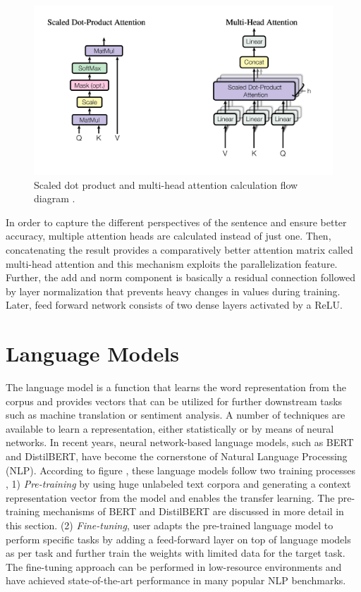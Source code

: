 \documentclass[%
	BCOR=8mm, %
	DIV=12,
	toc=bibliography, %
	toc=listof, %
	oneside, %
	egregdoesnotlikesansseriftitles, %
	]{scrbook}
\begin{document}
\begin{figure}
    \centering
    \includegraphics[width=0.7\linewidth]{screenshot001}
    \caption[Calculation flow diagram of Scaled dot product and multi-head attention]{\small Scaled dot product and multi-head attention calculation flow diagram \cite{vaswani_attention_2017}. }
    \label{fig:selftattentionandmulti}
\end{figure}
In order to capture the different perspectives of the sentence and ensure better accuracy, multiple attention heads are calculated instead of just one. Then, concatenating the result provides a comparatively better attention matrix called multi-head attention and this mechanism exploits the parallelization feature.\\
Further, the add and norm component is basically a residual connection followed by layer normalization that prevents heavy changes in values during training. Later, feed forward network consists of two dense layers activated by a ReLU. 
\section{Language Models}
\label{section:langaugemodels}
The language model is a function that learns the word representation from the corpus and provides vectors that can be utilized for further downstream tasks such as machine translation or sentiment analysis. A number of techniques are available to learn a representation, either statistically or by means of neural networks. In recent years, neural network-based language models, such as BERT and DistilBERT, have become the cornerstone of Natural Language Processing (NLP). According to figure , these language models follow two training processes , 1)\textit{ Pre-training} by using huge unlabeled text corpora and generating a context representation vector from the model \cite{devlin_bert_2019-1}  and enables the transfer learning. The pre-training mechanisms of BERT and DistilBERT are discussed in more detail in this section. (2) \textit{Fine-tuning}, user adapts the pre-trained language model to perform specific tasks by adding a feed-forward layer on top of language models as per task and further train the weights with limited data for the target task. The fine-tuning approach can be performed in low-resource environments and have achieved state-of-the-art performance in many popular NLP benchmarks.
\end{document}
